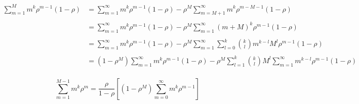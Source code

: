 \documentclass[letterpaper,12pt,oneside,final]{article}
\begin{document}
\begin{equation*}
  \begin{aligned}
    \sum_{m = 1}^{M} m^k \rho^{m-1} (1 - \rho) & = \sum_{m = 1}^{\infty} m^k \rho^{m-1} (1 - \rho) - \rho^{M} \sum_{m = M + 1}^{\infty} m^k \rho^{m - M - 1} (1 - \rho) \\
    & \\
    & = \sum_{m = 1}^{\infty} m^k \rho^{m-1} (1 - \rho) - \rho^{M}\sum_{m = 1}^{\infty} (m + M)^k \rho^{m - 1} (1 - \rho) \\
    & \\
    & = \sum_{m = 1}^{\infty} m^k \rho^{m-1} (1 - \rho) - \rho^{M} \sum_{m = 1}^{\infty} \sum_{l = 0}^k {k \choose l} m^{k-l} M^l \rho^{m - 1} (1 - \rho) \\
    & \\
    & = (1 - \rho^M) \sum_{m = 1}^{\infty} m^k \rho^{m-1} (1 - \rho) - \rho^{M} \sum_{l = 1}^k {k \choose l} M^l \sum_{m = 1}^{\infty}  m^{k-l} \rho^{m - 1} (1 - \rho) \\
  \end{aligned}
\end{equation*}


\begin{equation} \label{eq:kfirstMoments}
  \sum_{m = 1}^{M-1} m^k \rho^m = \frac{\rho}{1 - \rho} \left [ \left ( 1 - \rho^M \right ) \sum_{m = 0}^{\infty} m^k \rho^{m-1} \right ]
\end{equation}
\end{document}
